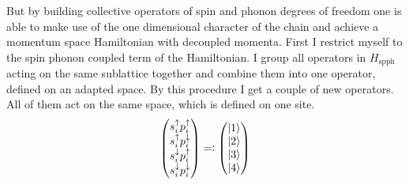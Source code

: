 But by building collective operators of spin and phonon degrees of freedom one is able to make use of the one dimensional character of the chain and achieve a momentum space Hamiltonian with decoupled momenta. First I restrict myself to the spin phonon coupled term of the Hamiltonian. I group all operators in $H_\text{spph}$ acting on the same sublattice together and combine them into one operator, defined on an adapted space. By this procedure I get a couple of new operators. All of them act on the same space, which is defined on one site.
\begin{align*}
    \begin{pmatrix}
        s_i^\uparrow p_i^\uparrow\\
        s_i^\uparrow p_i^\downarrow\\
        s_i^\downarrow p_i^\uparrow\\
        s_i^\downarrow p_i^\downarrow
    \end{pmatrix}=\vcentcolon \begin{pmatrix}
        \ket{1}\\
        \ket{2}\\
        \ket{3}\\
        \ket{4}
    \end{pmatrix}
\end{align*}

